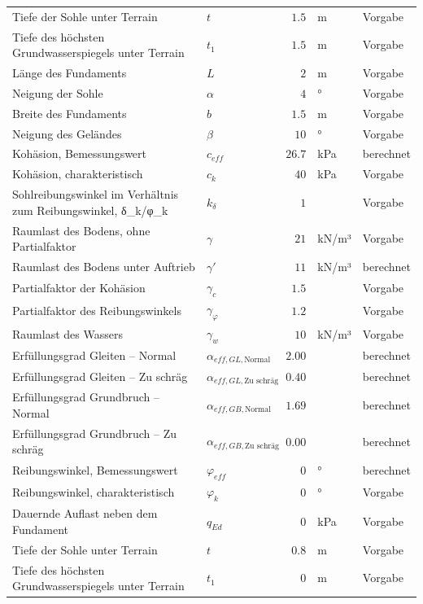 \documentclass[11pt,a4paper]{article}
\begin{document}
\begin{xltabular}{\linewidth}{>{\raggedright\arraybackslash}Xlrll}
Tiefe der Sohle unter Terrain & $t$ & $1.5$ & m & Vorgabe \\
Tiefe des höchsten Grundwasserspiegels unter Terrain & $t_1$ & $1.5$ & m & Vorgabe \\
Länge des Fundaments & $L$ & $2$ & m & Vorgabe \\
Neigung der Sohle & $\alpha$ & $4$ & ° & Vorgabe \\
Breite des Fundaments & $b$ & $1.5$ & m & Vorgabe \\
Neigung des Geländes & $\beta$ & $10$ & ° & Vorgabe \\
Kohäsion, Bemessungswert & $c_{eff}$ & $26.7$ & kPa & berechnet \\
Kohäsion, charakteristisch & $c_k$ & $40$ & kPa & Vorgabe \\
Sohlreibungswinkel im Verhältnis zum Reibungswinkel, δ\_k/φ\_k & $k_{\delta}$ & $1$ &  & Vorgabe \\
Raumlast des Bodens, ohne Partialfaktor & $\gamma$ & $21$ & kN/m³ & Vorgabe \\
Raumlast des Bodens unter Auftrieb & $\gamma'$ & $11$ & kN/m³ & berechnet \\
Partialfaktor der Kohäsion & $\gamma_c$ & $1.5$ &  & Vorgabe \\
Partialfaktor des Reibungswinkels & $\gamma_{\varphi}$ & $1.2$ &  & Vorgabe \\
Raumlast des Wassers & $\gamma_w$ & $10$ & kN/m³ & Vorgabe \\
Erfüllungsgrad Gleiten – Normal & $\alpha_{eff,GL,\text{Normal}}$ & $2.00$ &  & berechnet \\
Erfüllungsgrad Gleiten – Zu schräg & $\alpha_{eff,GL,\text{Zu schräg}}$ & $0.40$ &  & berechnet \\
Erfüllungsgrad Grundbruch – Normal & $\alpha_{eff,GB,\text{Normal}}$ & $1.69$ &  & berechnet \\
Erfüllungsgrad Grundbruch – Zu schräg & $\alpha_{eff,GB,\text{Zu schräg}}$ & $0.00$ &  & berechnet \\
Reibungswinkel, Bemessungswert & $\varphi_{eff}$ & $0$ & ° & berechnet \\
Reibungswinkel, charakteristisch & $\varphi_k$ & $0$ & ° & Vorgabe \\
Dauernde Auflast neben dem Fundament & $q_{Ed}$ & $0$ & kPa & Vorgabe \\
Tiefe der Sohle unter Terrain & $t$ & $0.8$ & m & Vorgabe \\
Tiefe des höchsten Grundwasserspiegels unter Terrain & $t_1$ & $0$ & m & Vorgabe \\

\end{xltabular}
\end{document}
